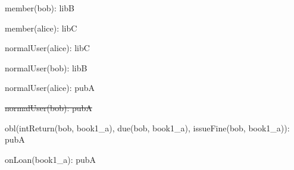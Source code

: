 \documentclass{article}
\begin{document}
{\begin{minipage}{\tableWidth}
\begin{description}[align=left,leftmargin=1em,noitemsep,labelsep=\parindent]
\item{{member(\allowbreak{}bob): libB}}
\item{{member(\allowbreak{}alice): libC}}
\item{{normalUser(\allowbreak{}alice): libC}}
\item{{normalUser(\allowbreak{}bob): libB}}
\item{{normalUser(\allowbreak{}alice): pubA}}
\item{\sout{normalUser(\allowbreak{}bob): pubA}}
\item{{obl(\allowbreak{}intReturn(\allowbreak{}bob, book1\_a), due(\allowbreak{}bob, book1\_a), issueFine(\allowbreak{}bob, book1\_a)): pubA}}
\item{{onLoan(\allowbreak{}book1\_a): pubA}}
\end{description}\end{minipage}}
\end{document}

